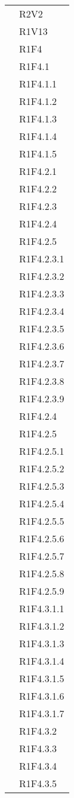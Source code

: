 \begin{longtable}{|>{\centering}m{5cm}|m{5cm}<{\centering}|}
&{R2V2}\\
&{R1V13}\\

&{R1F4}\\
&{R1F4.1}\\
&{R1F4.1.1}\\
&{R1F4.1.2}\\
&{R1F4.1.3}\\
&{R1F4.1.4}\\
&{R1F4.1.5}\\
&{R1F4.2.1}\\
&{R1F4.2.2}\\
&{R1F4.2.3}\\
&{R1F4.2.4}\\
&{R1F4.2.5}\\
&{R1F4.2.3.1}\\
&{R1F4.2.3.2}\\
&{R1F4.2.3.3}\\
&{R1F4.2.3.4}\\
&{R1F4.2.3.5}\\
&{R1F4.2.3.6}\\
&{R1F4.2.3.7}\\
&{R1F4.2.3.8}\\
&{R1F4.2.3.9}\\
&{R1F4.2.4}\\
&{R1F4.2.5}\\
&{R1F4.2.5.1}\\
&{R1F4.2.5.2}\\
&{R1F4.2.5.3}\\
&{R1F4.2.5.4}\\
&{R1F4.2.5.5}\\
&{R1F4.2.5.6}\\
&{R1F4.2.5.7}\\
&{R1F4.2.5.8}\\
&{R1F4.2.5.9}\\
&{R1F4.3.1.1}\\
&{R1F4.3.1.2}\\
&{R1F4.3.1.3}\\
&{R1F4.3.1.4}\\
&{R1F4.3.1.5}\\
&{R1F4.3.1.6}\\
&{R1F4.3.1.7}\\
&{R1F4.3.2}\\
&{R1F4.3.3}\\ 
&{R1F4.3.4}\\ 
&{R1F4.3.5}\\ \hline


\end{longtable}
